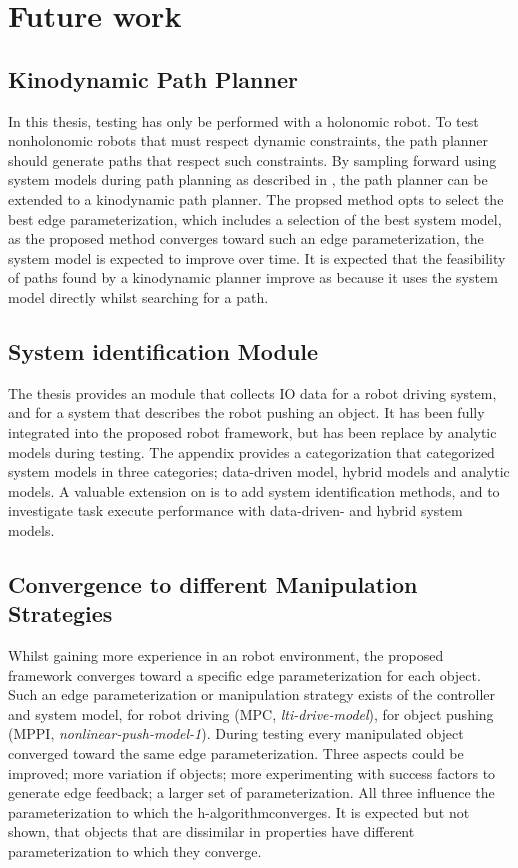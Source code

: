 \chapter{Future work}%
\label{chap:future_work}

\section*{Kinodynamic Path Planner}
In this thesis, testing has only be performed with a holonomic robot. To test nonholonomic robots that must respect dynamic constraints, the path planner should generate paths that respect such constraints. By sampling forward using system models during path planning as described in , the path planner can be extended to a kinodynamic path planner. The propsed method opts to select the best edge parameterization, which includes a selection of the best system model, as the proposed method converges toward such an edge parameterization, the system model is expected to improve over time. It is expected that the feasibility of paths found by a kinodynamic planner improve as because it uses the system model directly whilst searching for a path.\bs

\section*{System identification Module}
The thesis provides an module that collects \ac{IO} data for a robot driving system, and for a system that describes the robot pushing an object. It has been fully integrated into the proposed robot framework, but has been replace by analytic models during testing. The appendix provides a categorization that categorized system models in three categories; data-driven model, hybrid models and analytic models. A valuable extension on is to add system identification methods, and to investigate task execute performance with data-driven- and hybrid system models.\bs

\section*{Convergence to different Manipulation Strategies}
Whilst gaining more experience in an robot environment, the proposed framework converges toward a specific edge parameterization for each object. Such an edge parameterization or manipulation strategy exists of the controller and system model, for robot driving (\ac{MPC}, \textit{lti-drive-model}), for object pushing (\ac{MPPI}, \textit{nonlinear-push-model-1}). During testing every manipulated object converged toward the same edge parameterization. Three aspects could be improved; more variation if objects; more experimenting with success factors to generate edge feedback; a larger set of parameterization. All three influence the parameterization to which the \ac{h-algorithm}converges. It is expected but not shown, that objects that are dissimilar in properties have different parameterization to which they converge. 

